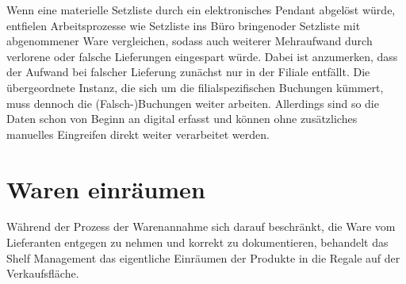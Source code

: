 Wenn eine materielle Setzliste durch ein elektronisches Pendant abgelöst würde, entfielen Arbeitsprozesse wie \glqq Setzliste ins Büro bringen\grqq oder \glqq Setzliste mit abgenommener Ware vergleichen\grqq, sodass auch weiterer Mehraufwand durch verlorene oder falsche Lieferungen eingespart würde. Dabei ist anzumerken, dass der Aufwand bei falscher Lieferung zunächst nur in der Filiale entfällt. Die übergeordnete Instanz, die sich um die filialspezifischen Buchungen kümmert, muss dennoch die (Falsch-)Buchungen weiter arbeiten. Allerdings sind so die Daten schon von Beginn an digital erfasst und können ohne zusätzliches manuelles Eingreifen direkt weiter verarbeitet werden.

\section{Waren einräumen}
\label{waren_einräumen}
Während der Prozess der Warenannahme sich darauf beschränkt, die Ware vom Lieferanten entgegen zu nehmen und korrekt zu dokumentieren, behandelt das Shelf Management das eigentliche Einräumen der Produkte in die Regale auf der Verkaufsfläche.\\

